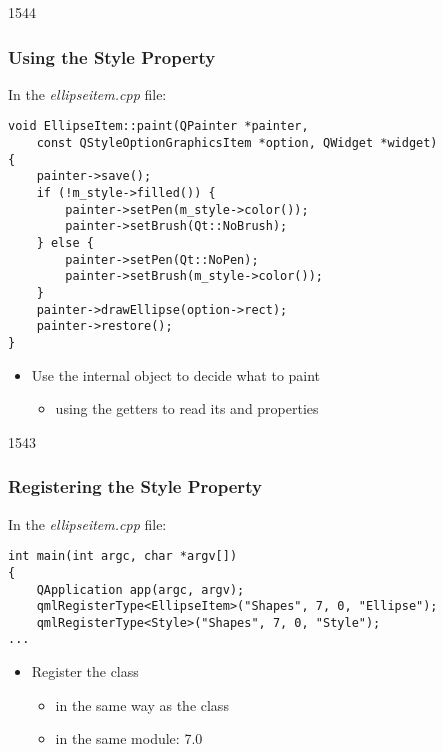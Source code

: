 \begin{slide}[fragile]{1544}\frametitle{Using the Style Property}

In the \textit{ellipseitem.cpp} file:

\vspace*{0.25em}
\begin{lstlisting}
void EllipseItem::paint(QPainter *painter,
    const QStyleOptionGraphicsItem *option, QWidget *widget)
{
    painter->save();
    if (!m_style->filled()) {
        painter->setPen(m_style->color());
        painter->setBrush(Qt::NoBrush);
    } else {
        painter->setPen(Qt::NoPen);
        painter->setBrush(m_style->color());
    }
    painter->drawEllipse(option->rect);
    painter->restore();
}
\end{lstlisting}

\begin{itemize}
\item Use the internal  object to decide what to paint
  \begin{itemize}
  \item using the getters to read its  and 
        properties
  \end{itemize}
\end{itemize}

\end{slide}

\begin{slide}[fragile]{1543}\frametitle{Registering the Style Property}

In the \textit{ellipseitem.cpp} file:

\vspace*{0.5em}
\begin{lstlisting}
int main(int argc, char *argv[])
{
    QApplication app(argc, argv);
    qmlRegisterType<EllipseItem>("Shapes", 7, 0, "Ellipse");
    qmlRegisterType<Style>("Shapes", 7, 0, "Style");
...
\end{lstlisting}

\vspace*{1.0em}
\begin{itemize}
\item Register the  class
  \begin{itemize}
  \item in the same way as the  class
  \item in the same module:  7.0
  \end{itemize}
\end{itemize}

\end{slide}

